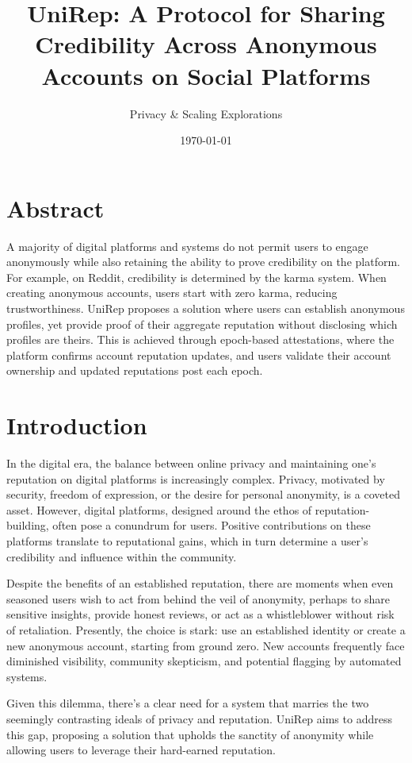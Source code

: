 \documentclass[11pt]{article}
\author{Privacy \& Scaling Explorations}
\date{\today}
\title{UniRep: A Protocol for Sharing Credibility Across Anonymous Accounts on Social Platforms}
\begin{document}
\maketitle
\tableofcontents

\section{Abstract}
\label{sec:org80d1cec}

A majority of digital platforms and systems do not permit users to engage anonymously while also retaining the ability to prove credibility on the platform. For example, on Reddit, credibility is determined by the karma system. When creating anonymous accounts, users start with zero karma, reducing trustworthiness. UniRep proposes a solution where users can establish anonymous profiles, yet provide proof of their aggregate reputation without disclosing which profiles are theirs. This is achieved through epoch-based attestations, where the platform confirms account reputation updates, and users validate their account ownership and updated reputations post each epoch.
\section{Introduction}
\label{sec:org70db807}

In the digital era, the balance between online privacy and maintaining one's reputation on digital platforms is increasingly complex. Privacy, motivated by security, freedom of expression, or the desire for personal anonymity, is a coveted asset. However, digital platforms, designed around the ethos of reputation-building, often pose a conundrum for users. Positive contributions on these platforms translate to reputational gains, which in turn determine a user's credibility and influence within the community.

Despite the benefits of an established reputation, there are moments when even seasoned users wish to act from behind the veil of anonymity, perhaps to share sensitive insights, provide honest reviews, or act as a whistleblower without risk of retaliation. Presently, the choice is stark: use an established identity or create a new anonymous account, starting from ground zero. New accounts frequently face diminished visibility, community skepticism, and potential flagging by automated systems.

Given this dilemma, there's a clear need for a system that marries the two seemingly contrasting ideals of privacy and reputation. UniRep aims to address this gap, proposing a solution that upholds the sanctity of anonymity while allowing users to leverage their hard-earned reputation.
\end{document}
